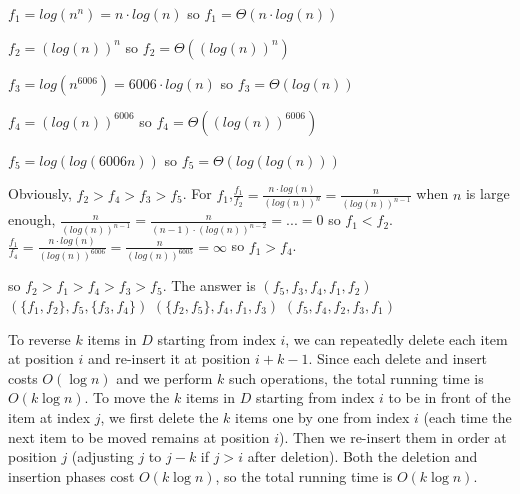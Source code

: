 \documentclass[12pt,twoside]{article}
\begin{document}


\begin{problems}

\problem  %

\begin{problemparts}
\problempart %
$f_1 = log(n^n) = n \cdot log(n)$
so $f_1 = \Theta(n \cdot log(n))$

$f_2 = (log(n))^n$
so $f_2 = \Theta((log(n))^n)$

$f_3 = log(n^{6006}) = 6006 \cdot log(n)$
so $f_3 = \Theta(log(n))$

$f_4 = (log(n))^{6006}$
so $f_4 = \Theta((log(n))^{6006})$

$f_5 = log(log(6006n))$
so $f_5 = \Theta(log(log(n)))$

Obviously, $f_2 > f_4 > f_3 > f_5$. 
For $f_1$,$\frac{f_1}{f_2} = \frac{n \cdot log(n)}{(log(n))^n} = \frac{n}{(log(n))^{n-1}}$ 
when $n$ is large enough, $\frac{n}{(log(n))^{n-1}} = \frac{n}{(n-1) \cdot (log(n))^{n-2}} = ... = 0$
so $f_1 < f_2$.$\frac{f_1}{f_4} = \frac{n \cdot log(n)}{(log(n))^{6006}} = \frac{n}{(log(n))^{6005}} = \infty $
so $f_1 > f_4$.

so $f_2 > f_1 > f_4 > f_3 > f_5$. The answer is $(f_5,f_3,f_4,f_1,f_2)$
\problempart %
$(\{f_1,f_2\},f_5,\{f_3,f_4\})$
\problempart %
$(\{f_2,f_5\},f_4,f_1,f_3)$
\problempart %
$(f_5,f_4,f_2,f_3,f_1)$
\end{problemparts}

\newpage
\problem  %

\begin{problemparts}
\problempart %
To reverse $k$ items in $D$ starting from index $i$, we can repeatedly delete each item 
at position $i$ and re-insert it at position $i+k-1$. Since each delete and insert costs 
$O(\log n)$ and we perform $k$ such operations, the total running time is $O(k \log n)$.
\problempart %
To move the $k$ items in $D$ starting from index $i$ to be in front of the item at 
index $j$, we first delete the $k$ items one by one from index $i$ (each time the next item 
to be moved remains at position $i$). Then we re-insert them in order at position $j$ 
(adjusting $j$ to $j-k$ if $j > i$ after deletion). Both the deletion and insertion phases 
cost $O(k \log n)$, so the total running time is $O(k \log n)$.
\end{problemparts}


\end{problems}
\end{document}
